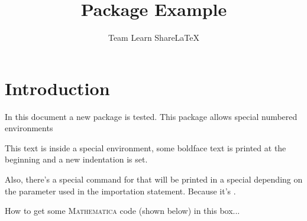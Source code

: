 \documentclass{article}
\title{Package Example}
\author{Team Learn ShareLaTeX}
\date{ }
\begin{document}
\maketitle

\section{Introduction}
In this document a new package is tested. This package allows special numbered environments

\begin{example}
This text is inside a special environment, some boldface text is printed
at the beginning and a new indentation is set.
\end{example}

Also, there's a special command for  that will be printed in a special  depending on the parameter used in the  importation statement. Because it's .

\begin{warning}
How to get some \textsc{Mathematica} code (shown below) in this box...\\
\lipsum[1][1]
\end{warning}

\printindex
\end{document}
